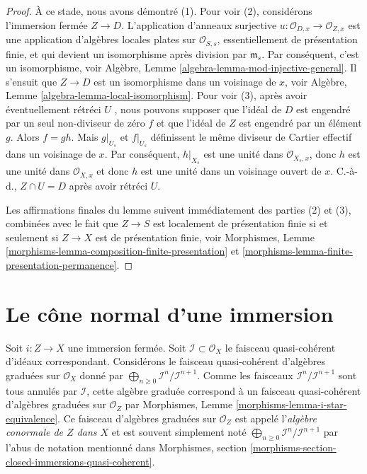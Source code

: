 \begin{proof}
\medskip\noindent
À ce stade, nous avons démontré (1). Pour voir (2), considérons l'immersion fermée
 $Z \to D$. L'application d'anneaux surjective  $u : \mathcal{O}_{D, x} \to \mathcal{O}_{Z, x}$  est une application
d'algèbres locales plates sur  $\mathcal{O}_{S, s}$, essentiellement de présentation finie,
et qui devient un isomorphisme après division par  $\mathfrak m_s$. Par conséquent,
c'est un isomorphisme, voir Algèbre, Lemme  \ref{algebra-lemma-mod-injective-general}. Il s'ensuit que
 $Z \to D$  est un isomorphisme dans un voisinage de  $x$, voir Algèbre,
Lemme  \ref{algebra-lemma-local-isomorphism}. Pour voir (3), après avoir éventuellement rétréci
 $U$ , nous pouvons supposer que l'idéal de  $D$  est engendré par
un seul non-diviseur de zéro  $f$  et que l'idéal de  $Z$  est
engendré par un élément  $g$. Alors  $f = gh$. Mais  $g|_{U_s}$  et
 $f|_{U_s}$  définissent le même diviseur de Cartier effectif dans un voisinage de
 $x$. Par conséquent,  $h|_{X_s}$  est une unité dans  $\mathcal{O}_{X_s, x}$, donc
 $h$  est une unité dans  $\mathcal{O}_{X, x}$  et donc  $h$  est une unité
dans un voisinage ouvert de  $x$. C.-à-d.,  $Z \cap U = D$  après avoir
rétréci  $U$.

\medskip\noindent
Les affirmations finales du lemme suivent immédiatement des parties (2) et (3),
combinées avec le fait que  $Z \to S$  est localement de présentation finie si et
seulement si  $Z \to X$  est de présentation finie, voir Morphismes, Lemme
 \ref{morphisms-lemma-composition-finite-presentation}  et  \ref{morphisms-lemma-finite-presentation-permanence}.
\end{proof}



\section{Le cône normal d'une immersion}
\label{section-normal-cone}

\noindent
Soit $i : Z \to X$ une immersion fermée. Soit $\mathcal{I} \subset \mathcal{O}_X$ le faisceau
quasi-cohérent d'idéaux correspondant. Considérons le faisceau quasi-cohérent
d'algèbres graduées sur $\mathcal{O}_X$ donné par $\bigoplus_{n \geq 0} \mathcal{I}^n/\mathcal{I}^{n + 1}$. Comme les faisceaux $\mathcal{I}^n/\mathcal{I}^{n + 1}$ sont tous
annulés par $\mathcal{I}$, cette algèbre graduée correspond à un faisceau quasi-cohérent
d'algèbres graduées sur $\mathcal{O}_Z$ par Morphismes, Lemme \ref{morphisms-lemma-i-star-equivalence}. Ce
faisceau d'algèbres graduées sur $\mathcal{O}_Z$ est appelé l'{\it algèbre conormale
de $Z$ dans $X$}  et est souvent simplement noté
 $\bigoplus_{n \geq 0} \mathcal{I}^n/\mathcal{I}^{n + 1}$ par l'abus de notation mentionné dans Morphismes, section \ref{morphisms-section-closed-immersions-quasi-coherent}.

